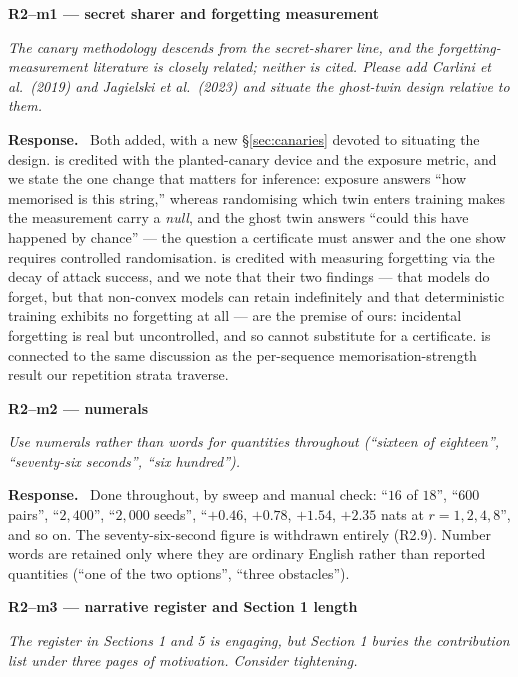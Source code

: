 \documentclass[11pt,a4paper]{article}
\newenvironment{point}[1]{%
  \par\medskip\noindent\textbf{\color{rcol}#1}\par\nopagebreak\smallskip\begingroup
  \color{rcol}\itshape}{\endgroup\par}
\newenvironment{reply}{%
  \par\smallskip\noindent\textbf{\color{acol}Response.}\ \begingroup}{\endgroup\par}
\begin{document}
\begin{point}{R2--m1 --- secret sharer and forgetting measurement}
The canary methodology descends from the secret-sharer line, and the
forgetting-measurement literature is closely related; neither is cited. Please add
Carlini et al.\ (2019) and Jagielski et al.\ (2023) and situate the ghost-twin design
relative to them.
\end{point}

\begin{reply}
Both added, with a new \S\ref{sec:canaries} devoted to situating the design. \citet{carlini2019secret}
is credited with the planted-canary device and the exposure metric, and we state the one
change that matters for inference: exposure answers ``how memorised is this string,''
whereas randomising which twin enters training makes the measurement carry a
\emph{null}, and the ghost twin answers ``could this have happened by chance'' --- the
question a certificate must answer and the one \citet{zhang2024mia} show requires
controlled randomisation. \citet{jagielski2023measuring} is credited with measuring
forgetting via the decay of attack success, and we note that their two findings --- that
models do forget, but that non-convex models can retain indefinitely and that
deterministic training exhibits no forgetting at all --- are the premise of ours:
incidental forgetting is real but uncontrolled, and so cannot substitute for a
certificate. \citet{barbulescu2024each} is connected to the same discussion as the
per-sequence memorisation-strength result our repetition strata traverse.
\end{reply}

\begin{point}{R2--m2 --- numerals}
Use numerals rather than words for quantities throughout (``sixteen of eighteen'',
``seventy-six seconds'', ``six hundred'').
\end{point}

\begin{reply}
Done throughout, by sweep and manual check: ``$16$ of $18$'', ``$600$ pairs'',
``$2{,}400$'', ``$2{,}000$ seeds'', ``$+0.46$, $+0.78$, $+1.54$, $+2.35$ nats at
$r = 1, 2, 4, 8$'', and so on. The seventy-six-second figure is withdrawn entirely
(R2.9). Number words are retained only where they are ordinary English rather than
reported quantities (``one of the two options'', ``three obstacles'').
\end{reply}

\begin{point}{R2--m3 --- narrative register and Section 1 length}
The register in Sections 1 and 5 is engaging, but Section 1 buries the contribution list
under three pages of motivation. Consider tightening.
\end{point}
\end{document}

